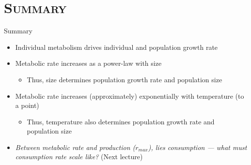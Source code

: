 \section{\scshape Summary}
   

\begin{frame}{Summary}

  \begin{itemize}[<+->] \setlength{\itemindent}{0em} \itemsep10pt
  
      \item Individual metabolism drives individual and population growth rate
      
      \item Metabolic rate increases as a power-law with size 
  
      \begin{itemize}
        \item  Thus, size determines population growth rate and population size
      \end{itemize}

      \item  Metabolic rate increases (approximately) exponentially with temperature (to a point)
      
      \begin{itemize}
        \item Thus, temperature also determines population growth rate and population size
      \end{itemize}
  
      \item {\it Between metabolic rate and production ($r_{max}$), lies 
       consumption --- what must consumption rate scale like?} (Next lecture)
  
  \end{itemize}  
  
  \end{frame}

